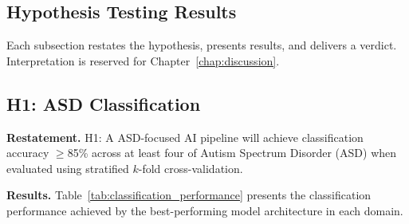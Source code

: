 \subsection{Hypothesis Testing Results}

Each subsection restates the hypothesis, presents results, and delivers a verdict. Interpretation is reserved for Chapter~\ref{chap:discussion}.


\subsection{H1: ASD Classification}

\textbf{Restatement.} H1: A ASD-focused AI pipeline will achieve classification accuracy $\geq$85\% across at least four of Autism Spectrum Disorder (ASD) when evaluated using stratified $k$-fold cross-validation.

\textbf{Results.} Table~\ref{tab:classification_performance} presents the classification performance achieved by the best-performing model architecture in each domain.

\iffalse %



